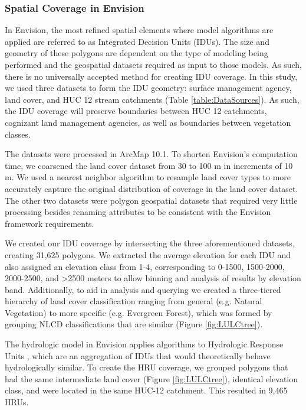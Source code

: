\documentclass[11pt,letterpaper]{article}
\begin{document}
\subsubsection{Spatial Coverage in Envision}

In Envision, the most refined spatial elements where model algorithms are applied are referred to as Integrated Decision Units (IDUs). The size and geometry of these polygons are dependent on the type of modeling being performed and the geospatial datasets required as input to those models. As such, there is no universally accepted method for creating IDU coverage. In this study, we used three datasets to form the IDU geometry: surface management agency, land cover, and HUC 12 stream catchments (Table \ref{table:DataSources}). As such, the IDU coverage will preserve boundaries between HUC 12 catchments, cognizant land management agencies, as well as boundaries between vegetation classes.  

The datasets were processed in ArcMap 10.1. To shorten Envision's computation time, we coarsened the land cover dataset from 30 to 100 m in increments of 10 m. We used a nearest neighbor algorithm to resample land cover types to more accurately capture the original distribution of coverage in the land cover dataset. The other two datasets were polygon geospatial datasets that required very little processing besides renaming attributes to be consistent with the Envision framework requirements.

We created our IDU coverage by intersecting the three aforementioned datasets, creating 31,625 polygons. We extracted the average elevation for each IDU and also assigned an elevation class from 1-4, corresponding to 0-1500, 1500-2000, 2000-2500, and >2500 meters to allow binning and analysis of results by elevation band. Additionally, to aid in analysis and querying we created a three-tiered hierarchy of land cover classification ranging from general (e.g. Natural Vegetation) to more specific (e.g. Evergreen Forest), which was formed by grouping NLCD classifications that are similar (Figure \ref{fig:LULCtree}).

The hydrologic model in Envision applies algorithms to Hydrologic Response Units \citep[HRUs,][]{Jin:2011ii,Turner:2016ia}, which are an aggregation of IDUs that would theoretically behave hydrologically similar. To create the HRU coverage, we grouped polygons that had the same intermediate land cover (Figure \ref{fig:LULCtree}), identical elevation class, and were located in the same HUC-12 catchment. This resulted in 9,465 HRUs.
\end{document}
